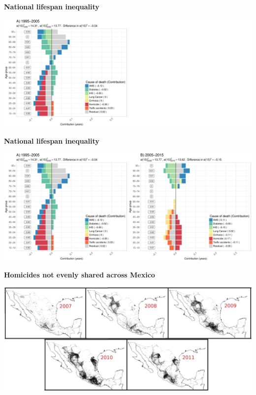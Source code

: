 \documentclass[xcolor={dvipsnames}]{beamer}
\begin{document}
\begin{frame}
\begin{center}
\Large{\textbf{National lifespan inequality}}
\end{center}

\hspace*{-1cm}   
\includegraphics[scale=.31]{Figures/Figure_2_2}

\end{frame}


\begin{frame}
\begin{center}
\Large{\textbf{National lifespan inequality}}
\end{center}

\hspace*{-1cm}   
\includegraphics[scale=.31]{Figures/Figure_2}

\end{frame}

\begin{frame}
\begin{center}
\Large{\textbf{Homicides not evenly shared across Mexico}}
\end{center}

\hspace*{-1cm}   
\includegraphics[scale=.78]{Figures/map1}

\end{frame}
\end{document}
